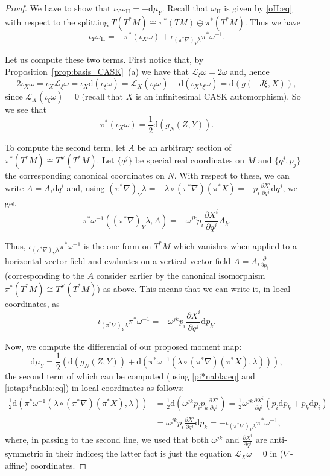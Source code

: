 \documentclass[10pt,a4paper]{amsart}
\newcommand{\hor}{\mathrm{H}}
\newcommand{\pd}[2]{\frac{\partial #1}{\partial #2}}
\newcommand{\ver}{\mathrm{V}}
\renewcommand{\d}{\mathrm{d}}
\begin{document}
	\begin{proof}
		We have to show that $\iota_Y\omega_\hor=-\d\mu_Y$. Recall that $\omega_\hor$ is given by \eqref{oH:eq} with respect to the splitting $T(T^*M)\cong\pi^*(TM)\oplus\pi^*(T^*M)$. Thus we have $$\iota_Y\omega_\hor=-\pi^*(\iota_X\omega)+\iota_{(\pi^*\nabla)_Y\lambda}\pi^*\omega^{-1}.$$
		
		Let us compute these two terms. First notice that, by Proposition~\ref{prop:basis_CASK}~(a) we have that 
		$\mathcal L_\xi\omega=2\omega$ and, hence $$2\iota_X\omega=\iota_X\mathcal L_\xi\omega =\iota_X\d(\iota_\xi\omega)=\mathcal L_X(\iota_\xi\omega)-\d(\iota_X\iota_\xi\omega)=\d(g(-J\xi,X)),$$ 
		since $\mathcal L_X(\iota_\xi\omega)=0$ (recall that $X$ is an infinitesimal CASK automorphism). So we see that \begin{equation}\label{iotaXomega:eq}
			\pi^*(\iota_X\omega)=\frac{1}{2}\d(g_N(Z,Y)).
		\end{equation}
	
		To compute the second term, let $A$ be an arbitrary section of $\pi^*(T^*M)\cong T^\ver(T^*M)$. Let $\{q^j\}$ be special real coordinates on $M$ and $\{q^j,p_j\}$ the corresponding canonical coordinates on $N$. With respect to these, we can write $A=A_i\d q^i$ and, using $(\pi^*\nabla)_Y\lambda=-\lambda\circ(\pi^*\nabla)(\pi^*X)=-p_i\pd{X^i}{q^j}\d q^j$, we get $$\pi^*\omega^{-1}((\pi^*\nabla)_Y\lambda,A)=-\omega^{jk}p_i\pd{X^i}{q^j}A_k.$$
		
		Thus, $\iota_{(\pi^*\nabla)_Y\lambda}\pi^*\omega^{-1}$ is the one-form on $T^*M$ which vanishes when applied to a horizontal vector field and evaluates on a vertical vector field $A=A_i\pd{}{p_i}$ (corresponding to the $A$ consider earlier by the canonical isomorphism $\pi^*(T^*M)\cong T^\ver(T^*M)$) as above. This means that we can write it, in local coordinates, as \begin{equation}\label{iotapi*nabla:eq}
			\iota_{(\pi^*\nabla)_Y\lambda}\pi^*\omega^{-1}=-\omega^{jk}p_i\pd{X^i}{q^j}\d p_k.
		\end{equation}
	
		Now, we compute the differential of our proposed moment map: $$\d\mu_Y=\frac{1}{2}\left(\d(g_N(Z,Y))+\d(\pi^*\omega^{-1}(\lambda\circ(\pi^*\nabla)(\pi^*X),\lambda))\right),$$ the second term of which can be computed (using \eqref{pi*nabla:eq} and \eqref{iotapi*nabla:eq}) in local coordinates as follows: \begin{align*}
			\frac{1}{2}\d(\pi^*\omega^{-1}(\lambda\circ(\pi^*\nabla)(\pi^*X),\lambda))&=\frac{1}{2}\d\left(\omega^{jk}p_ip_k\pd{X^i}{q^j}\right)=\frac{1}{2}\omega^{jk}\pd{X^i}{q^j}(p_i\d p_k+p_k\d p_i)\\
			&=\omega^{jk}p_i\pd{X^i}{q^j}\d p_k=-\iota_{(\pi^*\nabla)_Y\lambda}\pi^*\omega^{-1},
		\end{align*} where, in passing to the second line, we used that both $\omega^{jk}$ and $\pd{X^i}{q^j}$ are anti-symmetric in their indices; the latter fact is just the equation $\mathcal L_X \omega=0$ in ($\nabla$-affine) coordinates.\medskip
  

\end{proof}
\end{document}
